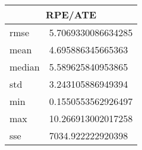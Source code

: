 \begin{table}[!ht] 
 \centering 
 \begin{tabular}{|l|l|} \hline 
 \multicolumn{2}{|c|}{RPE/ATE} \\ \hline 
 rmse & 5.7069330086634285 \\ \hline 
mean & 4.695886345665363 \\ \hline 
median & 5.589625840953865 \\ \hline 
std & 3.243105886949394 \\ \hline 
min & 0.1550553562926497 \\ \hline 
max & 10.266913002017258 \\ \hline 
sse & 7034.922222920398 \\ \hline 
\end{tabular} 
 \end{table}